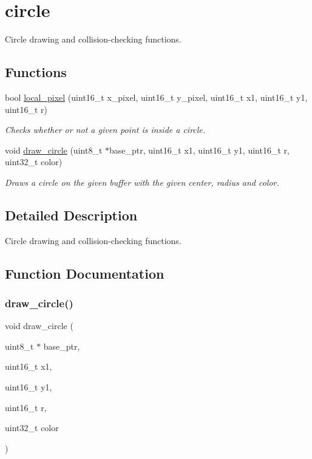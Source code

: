 \hypertarget{group__circle}{}\section{circle}
\label{group__circle}


Circle drawing and collision-\/checking functions.  


\subsection*{Functions}
\begin{DoxyCompactItemize}
\item 
bool \hyperlink{group__circle_gaf097cd6cfd9dde8acf534b2c2e1dbabd}{local\+\_\+pixel} (uint16\+\_\+t x\+\_\+pixel, uint16\+\_\+t y\+\_\+pixel, uint16\+\_\+t x1, uint16\+\_\+t y1, uint16\+\_\+t r)
\begin{DoxyCompactList}\small\item\em Checks whether or not a given point is inside a circle. \end{DoxyCompactList}\item 
void \hyperlink{group__circle_gad0932d378de29bbdb27306adf7927591}{draw\+\_\+circle} (uint8\+\_\+t $\ast$base\+\_\+ptr, uint16\+\_\+t x1, uint16\+\_\+t y1, uint16\+\_\+t r, uint32\+\_\+t color)
\begin{DoxyCompactList}\small\item\em Draws a circle on the given buffer with the given center, radius and color. \end{DoxyCompactList}\end{DoxyCompactItemize}


\subsection{Detailed Description}
Circle drawing and collision-\/checking functions. 



\subsection{Function Documentation}
\mbox{\label{group__circle_gad0932d378de29bbdb27306adf7927591}} 
\subsubsection{\texorpdfstring{draw\+\_\+circle()}{draw\_circle()}}
{\footnotesize\ttfamily void draw\+\_\+circle (\begin{DoxyParamCaption}\item[{uint8\+\_\+t $\ast$}]{base\+\_\+ptr,  }\item[{uint16\+\_\+t}]{x1,  }\item[{uint16\+\_\+t}]{y1,  }\item[{uint16\+\_\+t}]{r,  }\item[{uint32\+\_\+t}]{color }\end{DoxyParamCaption})}



